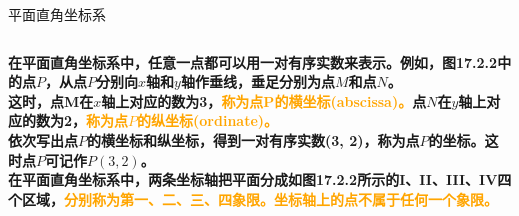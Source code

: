 \documentclass[aspectratio=169]{ctexbeamer} %
\begin{document}
\begin{frame}{平面直角坐标系}
\begin{columns}
\textbf{在平面直角坐标系中，任意一点都可以用一对有序实数来表示。例如，图17.2.2中的点$P$，从点$P$分别向$x$轴和$y$轴作垂线，垂足分别为点$M$和点$N$。}\\
\vspace{12pt}
\textbf{这时，点M在$x$轴上对应的数为3，\textcolor{orange}{称为点P的横坐标(abscissa)。}点$N$在$y$轴上对应的数为2，\textcolor{orange}{称为点$P$的纵坐标(ordinate)。}}\\
\vspace{12pt}
\textbf{依次写出点$P$的横坐标和纵坐标，得到一对有序实数(3, 2)，称为点$P$的坐标。这时点$P$可记作$P(3, 2)$。}\\
\vspace{12pt}
\textbf{在平面直角坐标系中，两条坐标轴把平面分成如图17.2.2所示的I、II、III、IV四个区域，\textcolor{orange}{分别称为第一、二、三、四象限。坐标轴上的点不属于任何一个象限。}}

\fig[1.4]
\end{columns}
\end{frame}
\end{document}

